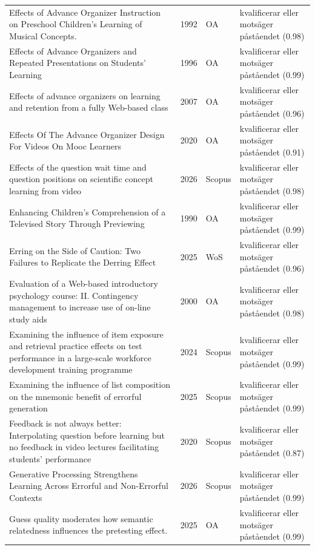 \begin{longtable}{@{}%
  >{\raggedright\arraybackslash}p{}c%
  >{\raggedright\arraybackslash}p{}%
  >{\raggedright\arraybackslash}p{}@{}}
Effects of Advance Organizer Instruction on Preschool Children's Learning of Musical Concepts. & 1992 & OA & kvalificerar eller motsäger påståendet (0.98) \\
Effects of Advance Organizers and Repeated Presentations on Students' Learning & 1996 & OA & kvalificerar eller motsäger påståendet (0.99) \\
Effects of advance organizers on learning and retention from a fully Web-based class & 2007 & OA & kvalificerar eller motsäger påståendet (0.96) \\
Effects Of The Advance Organizer Design For Videos On Mooc Learners & 2020 & OA & kvalificerar eller motsäger påståendet (0.91) \\
Effects of the question wait time and question positions on scientific concept learning from video & 2026 & Scopus & kvalificerar eller motsäger påståendet (0.98) \\
Enhancing Children's Comprehension of a Televised Story Through Previewing & 1990 & OA & kvalificerar eller motsäger påståendet (0.99) \\
Erring on the Side of Caution: Two Failures to Replicate the Derring Effect & 2025 & WoS & kvalificerar eller motsäger påståendet (0.96) \\
Evaluation of a Web-based introductory psychology course: II. Contingency management to increase use of on-line study aids & 2000 & OA & kvalificerar eller motsäger påståendet (0.98) \\
Examining the influence of item exposure and retrieval practice effects on test performance in a large-scale workforce development training programme & 2024 & Scopus & kvalificerar eller motsäger påståendet (0.99) \\
Examining the influence of list composition on the mnemonic benefit of errorful generation & 2025 & Scopus & kvalificerar eller motsäger påståendet (0.99) \\
Feedback is not always better: Interpolating question before learning but no feedback in video lectures facilitating students' performance & 2020 & Scopus & kvalificerar eller motsäger påståendet (0.87) \\
Generative Processing Strengthens Learning Across Errorful and Non-Errorful Contexts & 2026 & Scopus & kvalificerar eller motsäger påståendet (0.99) \\
Guess quality moderates how semantic relatedness influences the pretesting effect. & 2025 & OA & kvalificerar eller motsäger påståendet (0.99) \\

\end{longtable}
